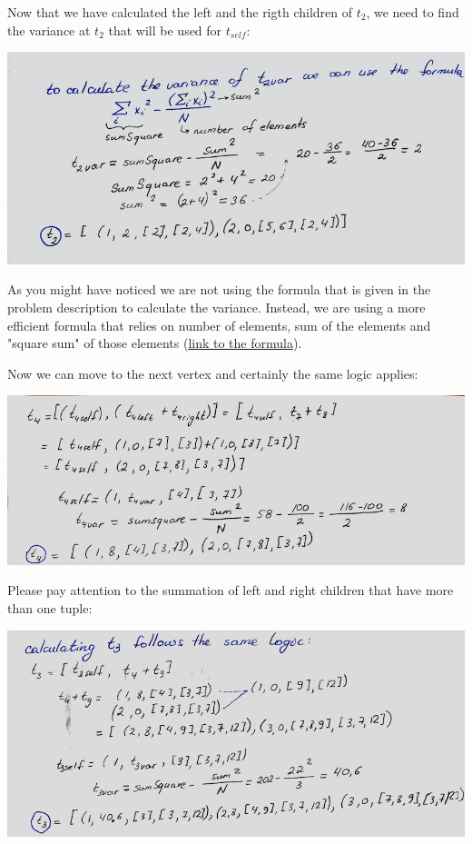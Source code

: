 \documentclass[11pt,a4paper,english]{article}
\begin{document}
        Now that we have calculated the left and the rigth children of $t_2$, we need to find the variance at $t_2$ that will be used for $t_{self}$:
        \begin{center}
          \includegraphics[width=15cm]{sc_3.png}
        \end{center}

        As you might have noticed we are not using the formula that is given in the problem description to calculate the variance. Instead, we are using a more efficient formula that relies on number of elements, sum of the elements and "square sum" of those elements (\href{https://math.stackexchange.com/questions/20593/calculate-variance-from-a-stream-of-sample-values}{link to the formula}).

        Now we can move to the next vertex and certainly the same logic applies:
        \begin{center}
          \includegraphics[width=15cm]{sc_4.png}
        \end{center}

        Please pay attention to the summation of left and right children that have more than one tuple:
        \begin{center}
          \includegraphics[width=15cm]{sc_5.png}
        \end{center}
\end{document}
